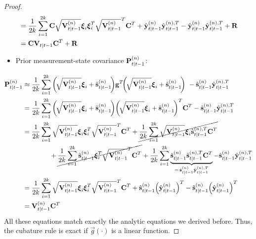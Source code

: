 \begin{proof}
\begin{align*}
					&= \frac{1}{2k} \sum_{i = 1}^{2k} \boldsymbol{\mathrm{C}} \sqrt{\boldsymbol{\mathrm{V}}_{t \vert t - 1}^{(n)}} \boldsymbol{\mathrm{\xi}}_i \boldsymbol{\mathrm{\xi}}_i^T \sqrt{\boldsymbol{\mathrm{V}}_{t \vert t - 1}^{(n)}}^T \boldsymbol{\mathrm{C}}^T + \hat{\boldsymbol{\mathrm{y}}}_{t \vert t - 1}^{(n)} \hat{\boldsymbol{\mathrm{y}}}_{t \vert t - 1}^{(n), T} - \hat{\boldsymbol{\mathrm{y}}}_{t \vert t - 1}^{(n)} \hat{\boldsymbol{\mathrm{y}}}_{t \vert t - 1}^{(n), T} + \boldsymbol{\mathrm{R}} \\
					&= \boldsymbol{\mathrm{C}} \boldsymbol{\mathrm{V}}_{t \vert t - 1} \boldsymbol{\mathrm{C}}^T + \boldsymbol{\mathrm{R}}
			\end{align*}
			\begin{itemize}
				\item Prior measurement-state covariance \( \boldsymbol{\mathrm{P}}_{t \vert t - 1}^{(n)} \):
			\end{itemize}
			\begin{align*}
				\mat{P}_{t \subgiven t - 1}^{(n)}
					&\approx \frac{1}{2k} \sum_{i = 1}^{2k} \bigg(\!\sqrt{\mat{V}_{t \subgiven t - 1}^{(n)}} \vec{\xi}_i + \hat{\vec{s}}_{t \subgiven t - 1}^{(n)}\!\bigg) \vec{g}^T\!\bigg(\!\sqrt{\mat{V}_{t \subgiven t - 1}^{(n)}} \vec{\xi}_i + \hat{\vec{s}}_{t \subgiven t - 1}^{(n)}\!\bigg)\ - \hat{\vec{s}}_{t \subgiven t - 1}^{(n)} \hat{\vec{y}}_{t \subgiven t - 1}^{(n), T} \\
					&= \frac{1}{2k} \sum_{i = 1}^{2k} \bigg(\!\sqrt{\mat{V}_{t \subgiven t - 1}^{(n)}} \vec{\xi}_i + \hat{\vec{s}}_{t \subgiven t - 1}^{(n)}\!\bigg) \bigg(\!\sqrt{\mat{V}_{t \subgiven t - 1}^{(n)}} \vec{\xi}_i + \hat{\vec{s}}_{t \subgiven t - 1}^{(n)}\!\bigg)^T \mat{C}^T - \hat{\vec{s}}_{t \subgiven t - 1}^{(n)} \hat{\vec{y}}_{t \subgiven t - 1}^{(n), T} \\
					&= \frac{1}{2k} \sum_{i = 1}^{2k} \sqrt{\mat{V}_{t \subgiven t - 1}^{(n)}} \vec{\xi}_i \vec{\xi}_i^T \sqrt{\mat{V}_{t \subgiven t - 1}^{(n)}}^T \mat{C}^T + \cancel{\frac{1}{2k} \sum_{i = 1}^{2k} \sqrt{\mat{V}_{t \subgiven t - 1}^{(n)}} \vec{\xi}_i \hat{\vec{s}}_{t \subgiven t - 1}^{(n), T} \mat{C}^T} \\
						&\qquad\qquad + \cancel{\frac{1}{2k} \sum_{i = 1}^{2k} \hat{\vec{s}}_{t \subgiven t - 1}^{(n)} \vec{\xi}_i^T \sqrt{\mat{V}_{t \subgiven t - 1}^{(n)}}^T \mat{C}^T} + \frac{1}{2k} \sum_{i = 1}^{2k} \underbrace{\hat{\vec{s}}_{t \subgiven t - 1}^{(n)} \hat{\vec{s}}_{t \subgiven t - 1}^{(n), T} \mat{C}^T}_{=\, \hat{\vec{s}}_{t \subgiven t - 1}^{(n)} \hat{\vec{y}}_{t \subgiven t - 1}^{(n), T}} - \hat{\vec{s}}_{t \subgiven t - 1}^{(n)} \hat{\vec{y}}_{t \subgiven t - 1}^{(n), T} \\
					&= \frac{1}{2k} \sum_{i = 1}^{2k} \sqrt{\mat{V}_{t \subgiven t - 1}^{(n)}} \vec{\xi}_i \vec{\xi}_i^T \sqrt{\mat{V}_{t \subgiven t - 1}^{(n)}}^T \mat{C}^T + \hat{\vec{s}}_{t \subgiven t - 1}^{(n)} \Big( \hat{\vec{y}}_{t \subgiven t - 1}^{(n)} \Big)^T - \hat{\vec{s}}_{t \subgiven t - 1}^{(n)} \Big( \hat{\vec{y}}_{t \subgiven t - 1}^{(n)} \Big)^T \\
					&= \mat{V}_{t \subgiven t - 1}^{(n)} \mat{C}^T
			\end{align*}
			All these equations match exactly the analytic equations we derived before. Thus, the cubature rule is exact if \(\vec{g}(\cdot)\) is a linear function.
		\end{proof}

